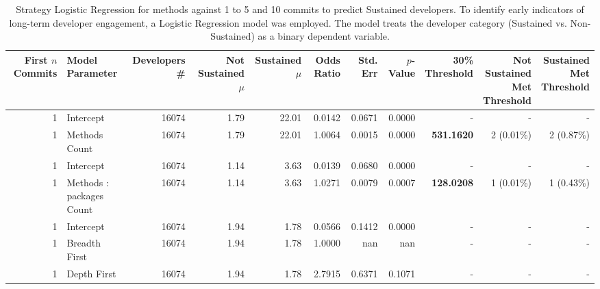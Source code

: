 \begin{landscape}
\begin{table}[H]
\centering
\setlength{\tabcolsep}{2pt}
\caption[Strategy Logistic Regression Sustained for methods for 1 to 5 and 10]{Strategy Logistic Regression for methods against 1 to 5 and 10 commits to predict Sustained developers. 
    To identify early indicators of long-term developer engagement, a Logistic Regression model was employed. The model treats the developer category (Sustained vs. Non-Sustained) as a binary dependent variable. }
\begin{tabular}{r l r r r r r r r r r}
\toprule
\makecell[t]{\textbf{First $n$}\\\textbf{Commits}} & \makecell[t]{\textbf{Model}\\\textbf{Parameter}} & \makecell[t]{\textbf{Developers}\\\textbf{\#}} & \makecell[t]{\textbf{Not}\\\textbf{Sustained}\\\textbf{$\mu$}} & \makecell[t]{\textbf{Sustained}\\\textbf{$\mu$}} & \textbf{Odds Ratio} & \textbf{Std. Err} & \textbf{$p$-Value} & \makecell[t]{\textbf{30\%}\\\textbf{Threshold}} & \makecell[t]{\textbf{Not}\\\textbf{Sustained}\\\textbf{Met}\\\textbf{Threshold}} & \makecell[t]{\textbf{Sustained}\\\textbf{Met}\\\textbf{Threshold}} \\ 
\midrule
1 & Intercept & 16074 & 1.79 & 22.01 & 0.0142 & 0.0671 & 0.0000 & - & - & - \\ 
1 & Methods Count & 16074 & 1.79 & 22.01 & 1.0064 & 0.0015 & 0.0000 & \textbf{531.1620} & 2 (0.01\%) & 2 (0.87\%) \\ 
1 & Intercept & 16074 & 1.14 & 3.63 & 0.0139 & 0.0680 & 0.0000 & - & - & - \\ 
1 & Methods : packages Count & 16074 & 1.14 & 3.63 & 1.0271 & 0.0079 & 0.0007 & \textbf{128.0208} & 1 (0.01\%) & 1 (0.43\%) \\ 
1 & Intercept & 16074 & 1.94 & 1.78 & 0.0566 & 0.1412 & 0.0000 & - & - & - \\ 
1 & Breadth First & 16074 & 1.94 & 1.78 & 1.0000 & nan & nan & - & - & - \\ 
1 & Depth First & 16074 & 1.94 & 1.78 & 2.7915 & 0.6371 & 0.1071 & - & - & - \\ 

\end{tabular}
\end{table}
\end{landscape}
